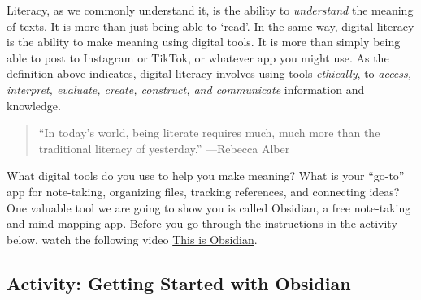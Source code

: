 \documentclass[
]{book}
\theoremstyle{definition}
\theoremstyle{definition}
\theoremstyle{definition}
\theoremstyle{definition}
\theoremstyle{remark}
\begin{document}
Literacy, as we commonly understand it, is the ability to \emph{understand} the meaning of texts. It is more than just being able to `read'. In the same way, digital literacy is the ability to make meaning using digital tools. It is more than simply being able to post to Instagram or TikTok, or whatever app you might use. As the definition above indicates, digital literacy involves using tools \emph{ethically}, to \emph{access, interpret, evaluate, create, construct, and communicate} information and knowledge.

\begin{quote}
``In today's world, being literate requires much, much more than the traditional literacy of yesterday.'' ---Rebecca Alber
\end{quote}

What digital tools do you use to help you make meaning? What is your ``go-to'' app for note-taking, organizing files, tracking references, and connecting ideas? One valuable tool we are going to show you is called Obsidian, a free note-taking and mind-mapping app. Before you go through the instructions in the activity below, watch the following video \href{https://www.youtube.com/watch?v=d2FNqEDGc8g}{This is Obsidian}.

\hypertarget{activity-getting-started-with-obsidian}{%
\subsection*{Activity: Getting Started with Obsidian}\label{activity-getting-started-with-obsidian}}
\end{document}
